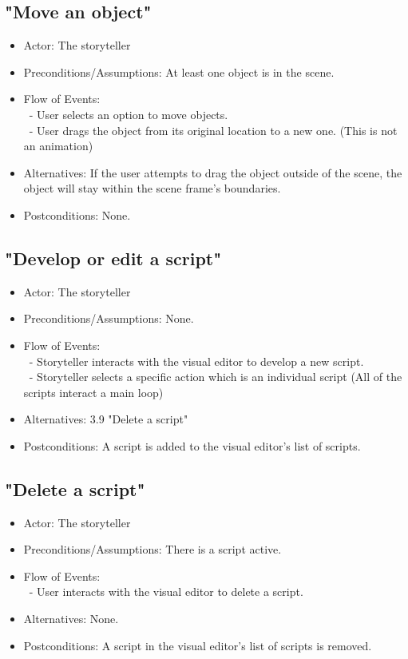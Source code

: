 \documentclass[12pt]{article}
\begin{document}
	\subsection{"Move an object"}
\begin{itemize}
	\item Actor: The storyteller
		\item Preconditions/Assumptions: At least one object is in the scene.
	\item Flow of Events: \\
	\	- User selects an option to move objects. \\
	\	- User drags the object from its original location to a new one. (This is not an animation)
	\item Alternatives: If the user attempts to drag the object outside of the scene, the object
	will stay within the scene frame's boundaries.
	\item Postconditions: None.
\end{itemize}

	
	\subsection{"Develop or edit a script"}
\begin{itemize}
		\item Actor: The storyteller
		\item Preconditions/Assumptions: None.
	\item Flow of Events: \\
	\	- Storyteller interacts with the visual editor to develop a new script. \\
	\   - Storyteller selects a specific action which is an individual script (All of the scripts interact a main loop) \\
	
	\item Alternatives: 3.9 "Delete a script"
	\item Postconditions: A script is added to the visual editor's list of scripts.
\end{itemize}

	\subsection{"Delete a script"}
\begin{itemize}
		\item Actor: The storyteller
		\item Preconditions/Assumptions: There is a script active.
	\item Flow of Events: \\
	\	- User interacts with the visual editor to delete a script.
	\item Alternatives: None.
	\item Postconditions: A script in the visual editor's list of scripts is removed.
\end{itemize}
	
\end{document}
